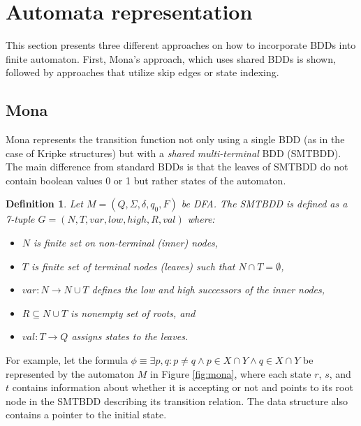 \documentclass[pdflatex,sn-mathphys-num]{sn-jnl}%
\theoremstyle{thmstyleone}%
\theoremstyle{thmstyletwo}%
\theoremstyle{thmstylethree}%
\newtheorem{definition}{Definition}%
\begin{document}
\section{Automata representation}
    This section presents three different approaches on how to incorporate BDDs into finite automaton. First, Mona's approach, which uses shared BDDs is shown, followed by approaches that utilize skip edges or state indexing.

    \subsection{Mona}
        Mona represents the transition function not only using a single BDD (as in the case of Kripke structures) but with a \textit{shared multi-terminal }BDD (SMTBDD). The main difference from standard BDDs is that the leaves of SMTBDD do not contain boolean values 0 or 1 but rather states of the automaton.

        \vspace*{0.5em}

        \begin{definition}
            Let $M = (Q, \Sigma, \delta, q_0, F)$ be DFA. The SMTBDD is defined as a 7-tuple $G = (N, T, var, low, high, R, val)$ where:
            \begin{itemize}[noindent]
                \item $N$ is finite set on non-terminal (inner) nodes,
                \item $T$ is finite set of terminal nodes (leaves) such that $N \cap T = \emptyset$,
                \item $var : N \rightarrow N \cup T$ defines the low and high successors of the inner nodes,
                \item $R \subseteq N \cup T$ is nonempty set of roots, and
                \item $val : T \rightarrow Q$ assigns states to the leaves.
            \end{itemize}
        \end{definition}

        For example, let the formula $\phi \equiv \exists p, q : p \neq q \land p \in X \cap Y \land q \in X \cap Y$ be represented by the automaton $M$ in Figure \ref{fig:mona}, where each state $r$, $s$, and $t$ contains information about whether it is accepting or not and points to its root node in the SMTBDD describing its transition relation. The data structure also contains a pointer to the initial state.
\end{document}
